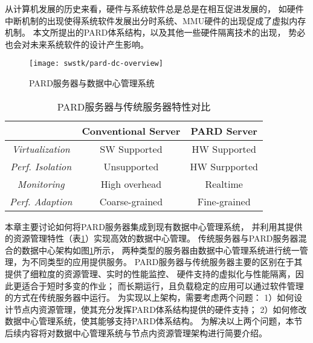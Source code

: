 
从计算机发展的历史来看，硬件与系统软件总是总是在相互促进发展的，
如硬件中断机制的出现使得系统软件发展出分时系统、MMU硬件的出现促成了虚拟内存机制。
本文所提出的PARD体系结构，以及其他一些硬件隔离技术的出现\cite{intel-rdt}，
势必也会对未来系统软件的设计产生影响。

\begin{figure}[tb]
  \centering
  \texttt{[image: swstk/pard-dc-overview]}
  \caption{PARD服务器与数据中心管理系统}
  \label{fig:pard-dc-overview}
\end{figure}

\begin{table}[tb]
\begin{center}
\begin{tabular}{c|c|c}
  \toprule[1.5pt]
  & \textbf{Conventional Server} & \textbf{PARD Server}\\
  \midrule[1pt]
  \emph{Virtualization} & SW Supported & HW Supported\\
  \hline
  \emph{Perf. Isolation} & Unsupported & HW Surpported\\
  \hline
  \emph{Monitoring} & High overhead & Realtime\\
  \hline
  \emph{Perf. Adaption} & Coarse-grained  & Fine-grained\\
  \hline
  \bottomrule[1.5pt]
\end{tabular}
\caption{PARD服务器与传统服务器特性对比}
\label{tab:pard-features}
\end{center}
\end{table}

本章主要讨论如何将PARD服务器集成到现有数据中心管理系统，
并利用其提供的资源管理特性（表\ref{tab:pard-features}）实现高效的数据中心管理。
传统服务器与PARD服务器混合的数据中心架构如图\ref{fig:pard-dc-overview}所示，
两种类型的服务器由数据中心管理系统进行统一管理，为不同类型的应用提供服务。
PARD服务器与传统服务器主要的区别在于其提供了细粒度的资源管理、实时的性能监控、
硬件支持的虚拟化与性能隔离，因此更适合于短时多变的作业；
而长期运行，且负载稳定的应用可以通过软件管理的方式在传统服务器中运行。
为实现以上架构，需要考虑两个问题：
1）如何设计节点内资源管理，使其充分发挥PARD体系结构提供的硬件支持；
2）如何修改数据中心管理系统，使其能够支持PARD体系结构。
为解决以上两个问题，本节后续内容将对数据中心管理系统与节点内资源管理架构进行简要介绍。


